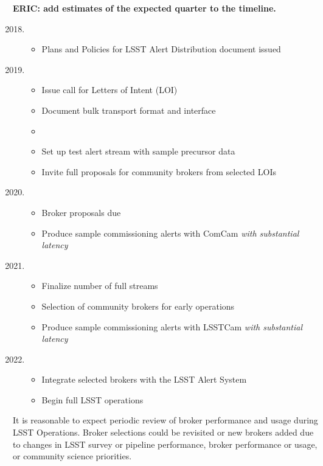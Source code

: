 \textbf{ERIC: add estimates of the expected quarter to the timeline. }
{
	\renewcommand\labelenumi{\textbf{\theenumi}}
\begin{enumerate}
  \setcounter{enumi}{2017}
	\item \begin{itemize} %
		\item Plans and Policies for LSST Alert Distribution document issued
	\end{itemize}
	\item \begin{itemize}%
		\item Issue call for Letters of Intent (LOI)
		\item Document bulk transport format and interface
		\item {}
		\item Set up test alert stream with sample precursor data
		\item Invite full proposals for community brokers from selected LOIs
		\end{itemize}
	\item \begin{itemize} %
		\item Broker proposals due
		\item Produce sample commissioning alerts with ComCam \textit{with substantial latency}
		\end{itemize}
	\item \begin{itemize} %
			\item Finalize number of full streams
			\item Selection of community brokers for early operations
			\item Produce sample commissioning alerts with LSSTCam \textit{with substantial latency}
		\end{itemize}

	\item \begin{itemize} %
			\item Integrate selected brokers with the LSST Alert System
			\item Begin full LSST operations
	\end{itemize}

\end{enumerate}
}


It is reasonable to expect periodic review of broker performance and usage during LSST Operations.
Broker selections could be revisited or new brokers added due to changes in LSST survey or pipeline performance, broker performance or usage, or community science priorities.
